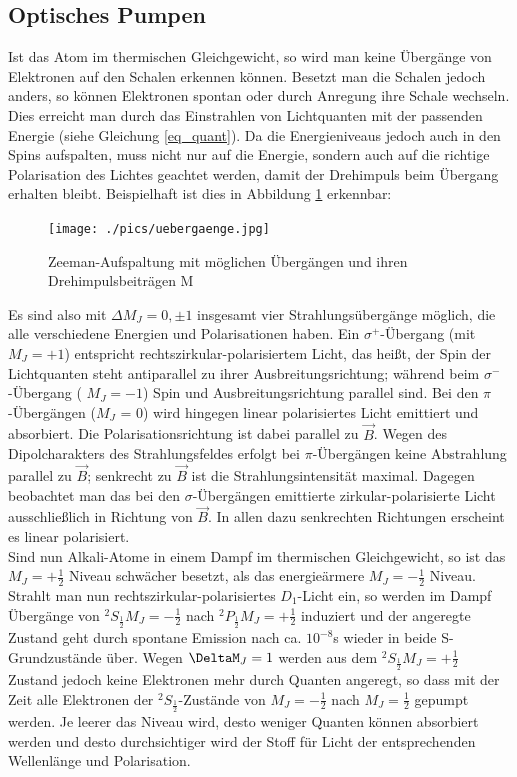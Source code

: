 \subsection{Optisches Pumpen}
Ist das Atom im thermischen Gleichgewicht, so wird man keine Übergänge von Elektronen auf den Schalen erkennen können. Besetzt man die Schalen jedoch anders, so können Elektronen spontan oder durch Anregung ihre Schale wechseln. Dies erreicht man durch das Einstrahlen von Lichtquanten mit der passenden Energie (siehe Gleichung \eqref{eq_quant}). Da die Energieniveaus jedoch auch in den Spins aufspalten, muss nicht nur auf die Energie, sondern auch auf die richtige Polarisation des Lichtes geachtet werden, damit der Drehimpuls beim Übergang erhalten bleibt. Beispielhaft ist dies in Abbildung \ref{pic_uebergang} erkennbar:
\begin{figure}[h]
\texttt{[image: ./pics/uebergaenge.jpg]}
\caption{Zeeman-Aufspaltung mit möglichen Übergängen und ihren Drehimpulsbeiträgen M}
\label{pic_uebergang}
\end{figure}
Es sind also mit $\Delta M_J =0,\pm 1$ insgesamt vier Strahlungsübergänge möglich, die alle verschiedene Energien und Polarisationen haben. Ein  $\sigma^+$-Übergang (mit  $M_J = +1$) entspricht rechtszirkular-polarisiertem Licht, das heißt, der Spin der Lichtquanten steht antiparallel zu ihrer Ausbreitungsrichtung; während beim $\sigma^-$-Übergang (  $M_J = -1$) Spin und Ausbreitungsrichtung parallel sind. Bei den $\pi$-Übergängen ($M_J$ = 0) wird
hingegen linear polarisiertes Licht emittiert und absorbiert. Die Polarisationsrichtung ist dabei parallel zu $\vec{B}$. Wegen des Dipolcharakters des Strahlungsfeldes erfolgt bei $\pi$-Übergängen keine Abstrahlung parallel zu $\vec{B}$; senkrecht zu $\vec{B}$ ist die Strahlungsintensität maximal. Dagegen beobachtet man das bei den $\sigma$-Übergängen emittierte zirkular-polarisierte Licht ausschließlich in Richtung von $\vec{B}$. In allen dazu senkrechten Richtungen erscheint es linear polarisiert.\\

Sind nun Alkali-Atome in einem Dampf im thermischen Gleichgewicht, so ist das $M_J=+\frac{1}{2}$ Niveau schwächer besetzt, als das energieärmere  $M_J=-\frac{1}{2}$ Niveau. Strahlt man nun rechtszirkular-polarisiertes $D_1$-Licht ein, so werden im Dampf Übergänge von $^2S_{\frac{1}{2}}M_J=-\frac{1}{2}$ nach $^2P_{\frac{1}{2}}M_J=+\frac{1}{2}$ induziert und der angeregte Zustand geht durch spontane Emission nach ca. $10^{-8}$s wieder in beide S-Grundzustände über. Wegen $\DeltaM_J=1$ werden aus dem $^2S_{\frac{1}{2}}M_J=+\frac{1}{2}$ Zustand jedoch keine Elektronen mehr durch Quanten angeregt, so dass mit der Zeit alle Elektronen der $^2S_{\frac{1}{2}}$-Zustände von $M_J=-\frac{1}{2}$ nach $M_J=\frac{1}{2}$ gepumpt werden. Je leerer das Niveau wird, desto weniger Quanten können absorbiert werden und desto durchsichtiger wird der Stoff für Licht der entsprechenden Wellenlänge und Polarisation.\\

